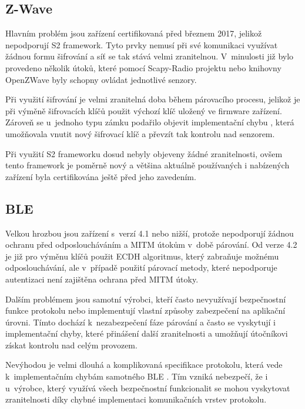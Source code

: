  \subsection{Z-Wave}
 Hlavním problém jsou zařízení certifikovaná před březnem 2017, jelikož nepodporují S2 framework.
 Tyto prvky nemusí při své komunikaci využívat žádnou formu šifrování a síť se tak stává 
 velmi zranitelnou. V~minulosti již bylo provedeno několik útoků, které pomocí
 Scapy-Radio projektu \cite{ezwave} nebo knihovny OpenZWave  byly schopny ovládat jednotlivé senzory. 
 
 Při využití šifrování je velmi zranitelná doba během párovacího procesu, jelikož je při výměně
 šifrovacích klíčů použit výchozí klíč uložený ve firmware zařízení. Zároveň se 
 u~jednoho typu zámku podařilo objevit implementační chybu \cite{zwave-S0-attack}, která umožňovala vnutit 
 nový šifrovací klíč a převzít tak kontrolu nad senzorem. 
 
 Při využití S2 frameworku dosud nebyly objeveny žádné zranitelnosti, ovšem tento
 framework je poměrně nový a většina aktuálně používaných i nabízených zařízení byla certifikována 
 ještě před jeho zavedením.
 
 \subsection{BLE}
 Velkou hrozbou jsou zařízení s~verzí 4.1 nebo nižší, protože nepodporují žádnou ochranu před 
 odposloucháváním a MITM útokům v~době párování. Od verze 4.2 je již pro výměnu klíčů použit ECDH 
 algoritmus, který zabraňuje možnému odposlouchávání, ale v~případě použití párovací metody, které
 nepodporuje autentizaci není zajištěna ochrana před MITM útoky.  \cite{cesnet-survey}
 
 Dalším problémem jsou samotní výrobci, kteří často nevyužívají bezpečnostní funkce protokolu  \cite{ble-locks} nebo
 implementují vlastní způsoby zabezpečení na aplikační úrovni. Tímto dochází k~nezabezpečení fáze 
 párování a často se vyskytují i implementační chyby, které přinášení další zranitelnosti \cite{ble-attack} a
 umožňují útočníkovi získat kontrolu nad celým provozem.  \cite{cesnet-survey}
 
 Nevýhodou je velmi dlouhá a komplikovaná specifikace protokolu, která vede k~implementačním 
 chybám samotného BLE \cite{blueborne}. Tím vzniká nebezpečí, že i u~výrobce, který využívá
 všech bezpečnostní funkcionalit
 se mohou vyskytovat zranitelnosti díky chybné implementaci komunikačních vrstev protokolu. \cite{cesnet-survey}
 
